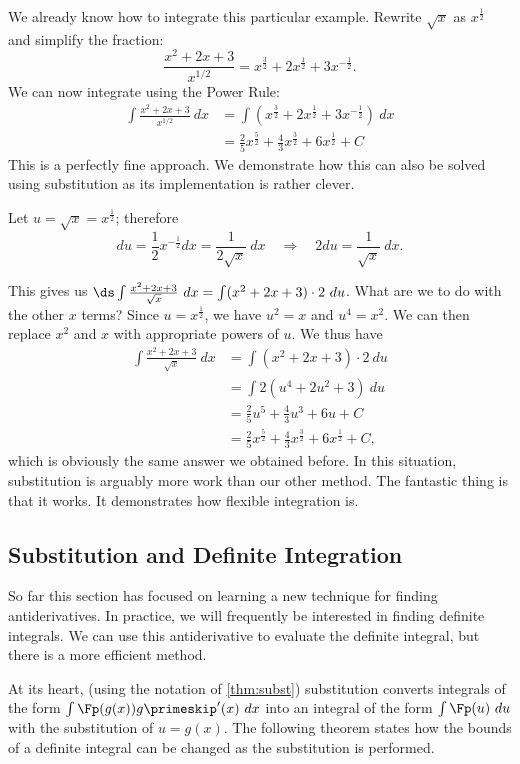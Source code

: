 {We already know how to integrate this particular example. Rewrite $\sqrt{x}$ as $x^\frac12$ and simplify the fraction:
	\[ \frac{x^2+2x+3}{x^{1/2}} = x^\frac32 + 2x^\frac12 + 3x^{-\frac12}.\]
We can now integrate using the Power Rule:
\begin{align*}
	\int \frac{x^2+2x+3}{x^{1/2}}\ dx &= \int\left(x^\frac32 + 2x^\frac12 + 3x^{-\frac12}\right)\ dx\\
	&=	\frac25x^\frac52 + \frac43x^\frac32 + 6x^\frac12 + C
\end{align*}
This is a perfectly fine approach. We demonstrate how this can also be solved using substitution as its implementation is rather clever.

Let $u = \sqrt{x} = x^\frac12$; therefore 
		\[du = \frac12x^{-\frac12}dx = \frac{1}{2\sqrt{x}}\ dx \quad \Rightarrow \quad 2du = \frac{1}{\sqrt{x}}\ dx.\]
		
This gives us $\ds \int \frac{x^2+2x+3}{\sqrt{x}}\ dx = \int (x^2+2x+3)\cdot2\ du$. What are we to do with the other $x$ terms? Since $u=x^{\frac12}$, we have $u^2=x$ and $u^4=x^2$. We can then replace $x^2$ and $x$ with appropriate powers of $u$. We thus have
\begin{align*}
	\int \frac{x^2+2x+3}{\sqrt{x}}\ dx
	&= \int (x^2+2x+3)\cdot2\ du\\
	&= \int 2(u^4 + 2u^2 + 3)\ du \\
	&= \frac25u^5 + \frac43u^3 + 6u + C \\
	&= \frac25x^\frac52 + \frac43x^\frac32 + 6x^\frac12+C,
\end{align*}
which is obviously the same answer we obtained before. In this situation, substitution is arguably more work than our other method. The fantastic thing is that it works. It demonstrates how flexible integration is.}


\subsection{Substitution and Definite Integration}

So far this section has focused on learning a new technique for finding antideriv\-atives. In practice, we will frequently be interested in finding definite integrals. We can use this antiderivative to evaluate the definite integral, but there is a more efficient method.

At its heart, (using the notation of \autoref{thm:subst}) substitution converts integrals of the form $\int \Fp(g(x))g\primeskip'(x)\ dx$ into an integral of the form $\int \Fp(u)\ du$ with the substitution of $u = g(x)$. The following theorem states how the bounds of a definite integral can be changed as the substitution is performed.

